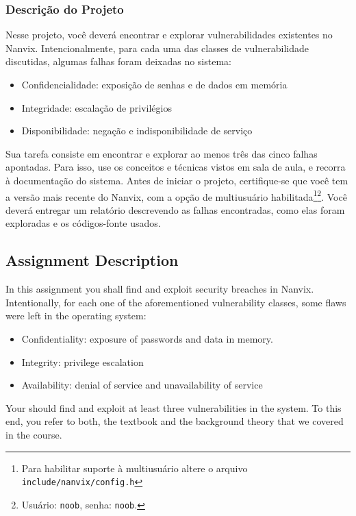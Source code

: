 \documentclass[11pt]{article}
\newif\ifbr
\newif\ifen
\begin{document}
\fi\fi

\ifbr
\subsubsection*{Descrição do Projeto}

Nesse projeto, você deverá encontrar e explorar vulnerabilidades
existentes no Nanvix. Intencionalmente, para cada uma das classes de
vulnerabilidade discutidas, algumas falhas foram deixadas no sistema:

\begin{itemize}
	\item Confidencialidade: exposição de senhas e de dados em memória
	\item Integridade: escalação de privilégios 
	\item Disponibilidade: negação e indisponibilidade de serviço
\end{itemize}

Sua tarefa consiste em encontrar e explorar ao menos três das cinco
falhas apontadas. Para isso, use os conceitos e técnicas vistos em sala
de aula, e recorra à documentação do sistema. Antes de iniciar o
projeto, certifique-se que você tem a versão mais recente do Nanvix, com
a opção de multiusuário habilitada\footnote{Para habilitar suporte à
multiusuário altere o arquivo
\texttt{include/nanvix/config.h}}\footnote{Usuário: \texttt{noob},
senha: \texttt{noob}.}. Você deverá entregar um relatório descrevendo as
falhas encontradas, como elas foram exploradas e os códigos-fonte
usados.

\else\ifen

\subsection*{Assignment Description}

In this assignment you shall find and exploit security breaches in
Nanvix. Intentionally, for each one of the aforementioned vulnerability
classes, some flaws were left in the operating system:

\begin{itemize}
	\item Confidentiality: exposure of passwords and data in memory.
	\item Integrity: privilege escalation
	\item Availability: denial of service and unavailability of service
\end{itemize}

Your should find and exploit at least three vulnerabilities in the
system. To this end, you refer to both, the textbook and the background
theory that we covered in the course.
\end{document}
